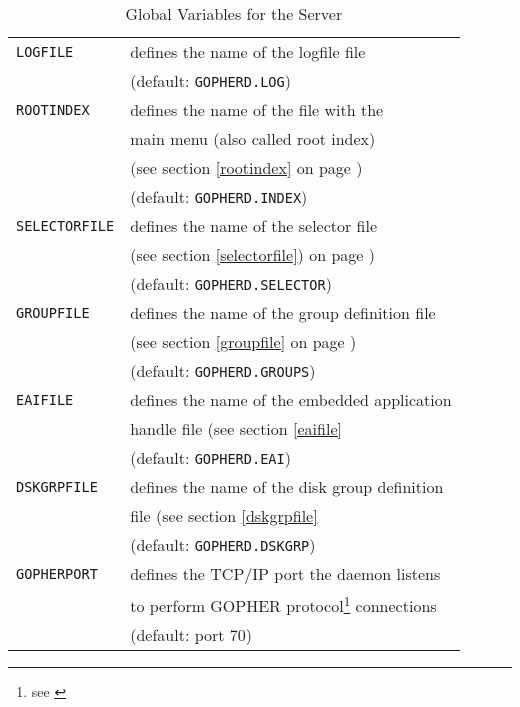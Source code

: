 \begin{table}
\caption{Global Variables for the Server}\label{srvglv}
\rule{0mm}{2mm}
\begin{center}
\begin{minipage}{\textwidth}
\begin{tabular}{|l|l|}\hline
{\tt LOGFILE}       &   defines the name of the logfile file\\
                    &   (default: {\tt GOPHERD.LOG})\\  \hline
{\tt ROOTINDEX}     &   defines the name of the file with the \\
                    &   main menu (also called root index)\\
                    &   (see section \ref{rootindex}
                        on page \pageref{rootindex}) \\
                    &   (default: {\tt GOPHERD.INDEX})\\  \hline
 
{\tt SELECTORFILE}  &   defines the name of the selector file\\
                    &   (see section \ref{selectorfile})
                        on page \pageref{selectorfile}) \\
                    &   (default: {\tt GOPHERD.SELECTOR})\\  \hline
 
{\tt GROUPFILE}     &   defines the name of the group definition file\\
                    &   (see section \ref{groupfile}
                        on page \pageref{groupfile}) \\
                    &   (default: {\tt GOPHERD.GROUPS})\\  
\hline
{\tt EAIFILE}       &   defines the name of the embedded application    \\
                    &   handle file (see section \ref{eaifile}          \\
                    &   (default: {\tt GOPHERD.EAI})                    \\
\hline
{\tt DSKGRPFILE}    &   defines the name of the disk group definition   \\
                    &   file (see section \ref{dskgrpfile}              \\
                    &   (default: {\tt GOPHERD.DSKGRP})                 \\
\hline

{\tt GOPHERPORT}& defines the TCP/IP port the daemon listens\\
                & to perform 
GOPHER protocol\footnote{see \cite{gophprot}} connections\\
                & (default: port 70) \\ \hline
 

\end{tabular}
\end{minipage}
\end{center}
\end{table}
